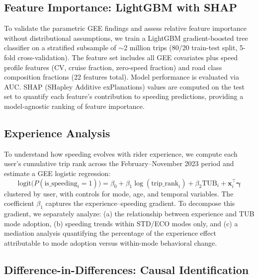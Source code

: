\subsection{Feature Importance: LightGBM with SHAP}
\label{sec:meth_shap}

To validate the parametric GEE findings and assess relative feature importance without distributional assumptions, we train a LightGBM gradient-boosted tree classifier on a stratified subsample of $\sim$2 million trips (80/20 train-test split, 5-fold cross-validation). The feature set includes all GEE covariates plus speed profile features (CV, cruise fraction, zero-speed fraction) and road class composition fractions (22 features total). Model performance is evaluated via AUC. SHAP (SHapley Additive exPlanations) values \citep{lundberg2017unified} are computed on the test set to quantify each feature's contribution to speeding predictions, providing a model-agnostic ranking of feature importance.

\subsection{Experience Analysis}
\label{sec:meth_experience}

To understand how speeding evolves with rider experience, we compute each user's cumulative trip rank across the February--November 2023 period and estimate a GEE logistic regression:
\begin{equation}
    \text{logit}\big(P(\text{is\_speeding}_i = 1)\big) = \beta_0 + \beta_1 \log(\text{trip\_rank}_i) + \beta_2 \text{TUB}_i + \boldsymbol{x}_i^{\top} \boldsymbol{\gamma}
    \label{eq:experience}
\end{equation}
clustered by user, with controls for mode, age, and temporal variables. The coefficient $\beta_1$ captures the experience--speeding gradient. To decompose this gradient, we separately analyze: (a) the relationship between experience and TUB mode adoption, (b) speeding trends within STD/ECO modes only, and (c) a mediation analysis quantifying the percentage of the experience effect attributable to mode adoption versus within-mode behavioral change.

\subsection{Difference-in-Differences: Causal Identification}
\label{sec:meth_did}


